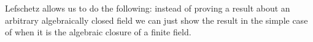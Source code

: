 Lefschetz allows us to do the following:
instead of proving a result about an arbitrary algebraically closed field
we can just show the result in the simple case of when
it is the algebraic closure of a finite field.



